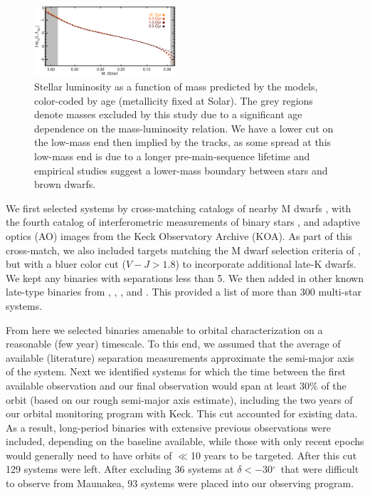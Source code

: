\documentclass[twocolumn]{aastex62}
\newcommand{\degree}{$^{\circ}$}
\begin{document}
\begin{figure}[htb]
\begin{center}
\includegraphics[width=0.47\textwidth]{Model_age2.eps}
\caption{Stellar luminosity as a function of mass predicted by the \citet{BHAC15} models, color-coded by age (metallicity fixed at Solar). The grey regions denote masses excluded by this study due to a significant age dependence on the mass-luminosity relation. We have a lower cut on the low-mass end then implied by the tracks, as some spread at this low-mass end is due to a longer pre-main-sequence lifetime and empirical studies suggest a lower-mass boundary between stars and brown dwarfs. }
\label{fig:age}
\end{center}
\end{figure}

We first selected systems by cross-matching catalogs of nearby M dwarfs \citep{Lepine:2013, Gaidos2014, 2014ApJ...784..156D,Winters2015}, with the fourth catalog of interferometric measurements of binary stars \citep[INT4,][]{Hartkopf:2001}, and adaptive optics (AO) images from the Keck Observatory Archive (KOA). As part of this cross-match, we also included targets matching the M dwarf selection criteria of \citet{Gaidos2014}, but with a bluer color cut ($V-J>1.8$) to incorporate additional late-K dwarfs. We kept any binaries with separations less than 5\arcsec. We then added in other known late-type binaries from \citet{2008MNRAS.384..150L}, \citet{Jnn2012}, \citet{Jnn2014}, and \citet{Ward-Duong2015}. This provided a list of more than 300 multi-star systems.

From here we selected binaries amenable to orbital characterization on a reasonable (few year) timescale. To this end, we assumed that the average of available (literature) separation measurements approximate the semi-major axis of the system. Next we identified systems for which the time between the first available observation and our final observation would span at least 30\% of the orbit (based on our rough semi-major axis estimate), including the two years of our orbital monitoring program with Keck. This cut accounted for existing data. As a result, long-period binaries with extensive previous observations were included, depending on the baseline available, while those with only recent epochs would generally need to have orbits of $\ll$10 years to be targeted. After this cut 129 systems were left. After excluding 36 systems at $\delta<-30$\degree\ that were difficult to observe from Maunakea, 93 systems were placed into our observing program. 
\end{document}
